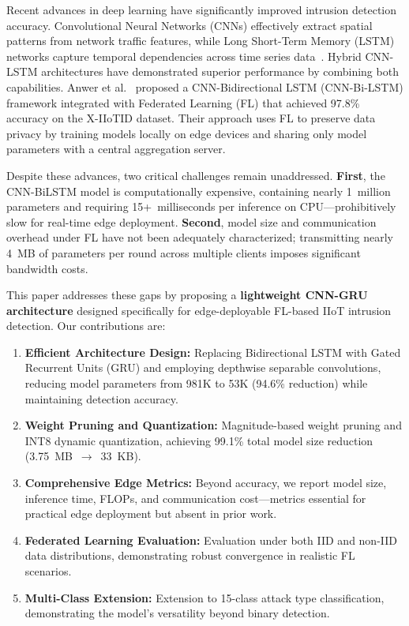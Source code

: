 \documentclass[a4paper,fleqn]{cas-sc}
\begin{document}
Recent advances in deep learning have significantly improved intrusion detection accuracy. Convolutional Neural Networks (CNNs) effectively extract spatial patterns from network traffic features, while Long Short-Term Memory (LSTM) networks capture temporal dependencies across time series data~\cite{vinayakumar2017cnn,chawla2022hybrid}. Hybrid CNN-LSTM architectures have demonstrated superior performance by combining both capabilities. Anwer et al.~\cite{anwer2025advanced} proposed a CNN-Bidirectional LSTM (CNN-Bi-LSTM) framework integrated with Federated Learning (FL) that achieved 97.8\% accuracy on the X-IIoTID dataset. Their approach uses FL to preserve data privacy by training models locally on edge devices and sharing only model parameters with a central aggregation server.

Despite these advances, two critical challenges remain unaddressed. \textbf{First}, the CNN-BiLSTM model is computationally expensive, containing nearly 1~million parameters and requiring 15+~milliseconds per inference on CPU---prohibitively slow for real-time edge deployment. \textbf{Second}, model size and communication overhead under FL have not been adequately characterized; transmitting nearly 4~MB of parameters per round across multiple clients imposes significant bandwidth costs.

This paper addresses these gaps by proposing a \textbf{lightweight CNN-GRU architecture} designed specifically for edge-deployable FL-based IIoT intrusion detection. Our contributions are:
\begin{enumerate}
    \item \textbf{Efficient Architecture Design:} Replacing Bidirectional LSTM with Gated Recurrent Units (GRU) and employing depthwise separable convolutions, reducing model parameters from 981K to 53K (94.6\% reduction) while maintaining detection accuracy.
    \item \textbf{Weight Pruning and Quantization:} Magnitude-based weight pruning and INT8 dynamic quantization, achieving 99.1\% total model size reduction (3.75~MB~$\rightarrow$~33~KB).
    \item \textbf{Comprehensive Edge Metrics:} Beyond accuracy, we report model size, inference time, FLOPs, and communication cost---metrics essential for practical edge deployment but absent in prior work.
    \item \textbf{Federated Learning Evaluation:} Evaluation under both IID and non-IID data distributions, demonstrating robust convergence in realistic FL scenarios.
    \item \textbf{Multi-Class Extension:} Extension to 15-class attack type classification, demonstrating the model's versatility beyond binary detection.
\end{enumerate}
\end{document}
